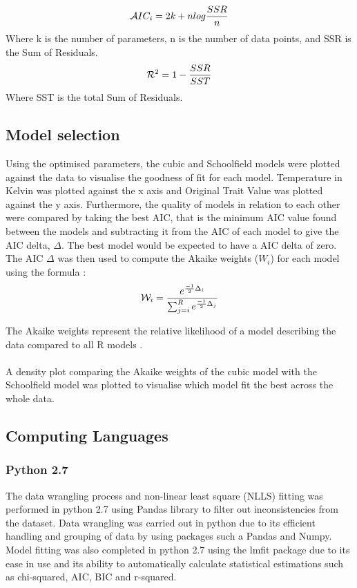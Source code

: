 {\begin{equation}
\mathcal AIC_i = 2k + nlog\frac{SSR}{n}\\
\end{equation}
Where k is the number of parameters, n is the number of data points, and SSR is the Sum of Residuals.
\begin{equation}
\mathcal R^2 = 1 - \frac{SSR}{SST}\\
\end{equation}
Where SST is the total Sum of Residuals.
\subsection*{Model selection}

Using the optimised parameters, the cubic and Schoolfield models were plotted against the data to visualise the goodness of fit for each model. Temperature in Kelvin was plotted against the x axis and Original Trait Value was plotted against the y axis. Furthermore, the quality of models in relation to each other were compared by taking the best AIC, that is the minimum AIC value found between the models and subtracting it from the AIC of each model to give the AIC delta, $\Delta$. The best model would be expected to have a AIC delta of zero. The AIC $\Delta$ was then used to compute the Akaike weights ($W_i$) for each model using the formula \citep{Johnson2004}: 
\begin{equation}
\mathcal W_i = \frac{e^{\frac{-1}{2}\Delta_i}}{\sum_{j=i}^{R}\*e^{\frac{-1}{2}\Delta_j}}\\
\end{equation}
 
The Akaike weights represent the relative likelihood of a model describing the data compared to all R models \citep{Wagenmakers2004}. 
\\~\\
A density plot comparing the Akaike weights of the cubic model with the Schoolfield model was plotted to visualise which model fit the best across the whole data. 

\subsection*{Computing Languages}
\subsubsection*{Python 2.7}
The data wrangling process and non-linear least square (NLLS) fitting was performed in python 2.7 using Pandas library to filter out inconsistencies from the dataset. Data wrangling was carried out in python due to its efficient handling and grouping of data by using packages such a Pandas and Numpy. Model fitting was also completed in python 2.7 using the lmfit package \citep{Newville2014} due to its ease in use and its ability to automatically calculate statistical estimations such as chi-squared, AIC, BIC and r-squared.  

}

